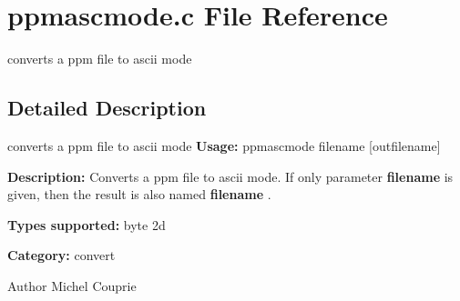\section{ppmascmode.c File Reference}
\label{ppmascmode_8c}


converts a ppm file to ascii mode  




\subsection{Detailed Description}
converts a ppm file to ascii mode {\bfseries Usage:} ppmascmode filename [outfilename]

{\bfseries Description:} Converts a ppm file to ascii mode. If only parameter {\bfseries filename} is given, then the result is also named {\bfseries filename} .

{\bfseries Types supported:} byte 2d

{\bfseries Category:} convert

\begin{DoxyAuthor}{Author}
Michel Couprie 
\end{DoxyAuthor}
